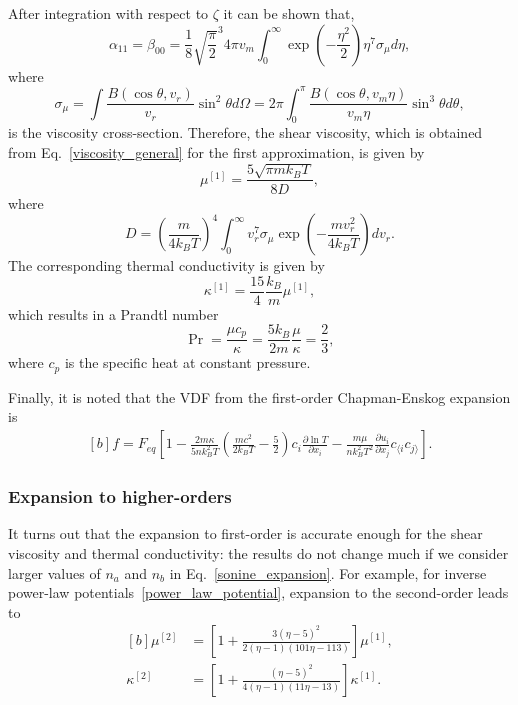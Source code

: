 After integration with respect to $\zeta$ it can be shown that, 
\begin{equation}
\alpha_{11}=\beta_{00}
=\frac{1}{8}\sqrt{\frac{\pi}{2}}^3{4\pi{v_m}}\int_0^\infty\exp\left(-\frac{\eta^2}{2}\right)\eta^7\sigma_{\mu}d\eta,
\end{equation}
where 
\begin{equation}
\sigma_{\mu}=\int \frac{B(\cos\theta,v_r)}{v_r}\sin^2\theta {d\Omega}=2\pi\int_0^\pi \frac{B(\cos\theta,v_m\eta)}{v_m\eta}\sin^3\theta {d\theta},
\end{equation}
is the viscosity cross-section. Therefore, the shear viscosity, which is obtained from Eq.~\eqref{viscosity_general} for the first approximation, is given by
\begin{equation}\label{shear_CE_viscosity0}
\mu^{[1]}=\frac{5\sqrt{\pi{m}k_BT}}{8D},
\end{equation}
where
\begin{equation}\label{shear_CE_viscosity} 
D=\left(\frac{m}{4k_BT}\right)^4\int_0^\infty
v_r^7\sigma_{\mu}\exp\left(-\frac{mv^2_r}{4k_BT}\right)dv_r.
\end{equation}
The corresponding thermal conductivity is given by
\begin{equation}\label{shear_CE_thermal0}
{\kappa}^{[1]}=\frac{15}{4}\frac{k_B}{m}\mu^{[1]},
\end{equation}
which results in a Prandtl number
\begin{equation}\label{Prandtl_number}
\Pr=\frac{\mu{c_p}}{\kappa}=\frac{5k_B}{2m}\frac{\mu}{\kappa}=\frac{2}{3},
\end{equation}
where $c_p$ is the specific heat at constant pressure.

Finally, it is noted that the VDF from the first-order Chapman-Enskog expansion is
\begin{equation*}
\begin{aligned}[b]
f=F_{eq}\left[1-\frac{2m{\kappa}}{5nk_B^2T}\left(\frac{mc^2}{2k_BT} -\frac{5}{2}\right)c_i\frac{\partial \ln{T}}{\partial x_i}
-\frac{m\mu{}}{n{k_B^2}T^2}\frac{\partial u_i}{\partial x_j}c_{\langle i}c_{j\rangle} \right].
\end{aligned}
\end{equation*}



\subsubsection{Expansion to higher-orders}
It turns out that the expansion to first-order is accurate enough for the shear viscosity and thermal conductivity: the results do not change much if we consider larger values of $n_a$ and $n_b$ in Eq.~\eqref{sonine_expansion}.  For example, for inverse power-law potentials~\eqref{power_law_potential}, expansion to the second-order leads to 
\begin{equation*}
\begin{aligned}[b]
\mu^{[2]}&=\left[1+\frac{3(\eta-5)^2}{2(\eta-1)(101\eta-113)}\right]\mu^{[1]}, \\
\kappa^{[2]}&=\left[1+\frac{(\eta-5)^2}{4(\eta-1)(11\eta-13)}\right]\kappa^{[1]}.
\end{aligned}
\end{equation*}

